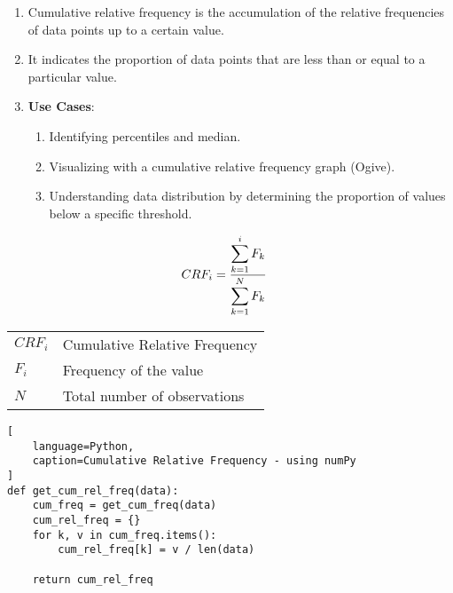 \begin{enumerate}
    \item Cumulative relative frequency is the accumulation of the relative frequencies of data points up to a certain value. \hfill \cite{common/online/chatgpt}

    \item It indicates the proportion of data points that are less than or equal to a particular value. \hfill \cite{common/online/chatgpt}

    \item \textbf{Use Cases}: \hfill \cite{statistics/book/Statistics-for-Data-Scientists/Maurits-Kaptein}
    \begin{enumerate}
        \item Identifying percentiles and median. \hfill \cite{statistics/book/Statistics-for-Data-Scientists/Maurits-Kaptein}

        \item Visualizing with a cumulative relative frequency graph (Ogive). \hfill \cite{statistics/book/Statistics-for-Data-Scientists/Maurits-Kaptein}

        \item Understanding data distribution by determining the proportion of values below a specific threshold. \hfill \cite{statistics/book/Statistics-for-Data-Scientists/Maurits-Kaptein}
    \end{enumerate}
\end{enumerate}



\begin{table}[H]
    \begin{minipage}{0.3\linewidth}
        \[
            \begin{aligned}
                CRF_i
                    &= \dfrac{\displaystyle\sum_{k=1}^{i} F_{k}}{\displaystyle\sum_{k=1}^{N} F_{k}}
            \end{aligned}
        \]
    \end{minipage}
    \begin{minipage}{0.65\linewidth}
        \begin{table}[H]
            \begin{tabular}{l l}
                $CRF_i$ & Cumulative Relative Frequency \\
                $F_i$ & Frequency of the value \\
                $N$ & Total number of observations \\
            \end{tabular}
        \end{table}
    \end{minipage}
\end{table}

\begin{lstlisting}[
    language=Python,
    caption=Cumulative Relative Frequency - using numPy
]
def get_cum_rel_freq(data):
    cum_freq = get_cum_freq(data)
    cum_rel_freq = {}
    for k, v in cum_freq.items():
        cum_rel_freq[k] = v / len(data)

    return cum_rel_freq
\end{lstlisting}

